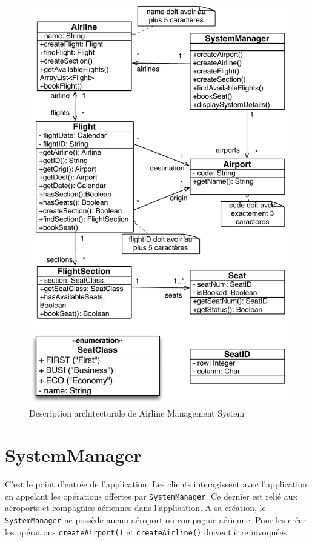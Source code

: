 \documentclass[a4paper,12pt,francais,twoside]{article}
\begin{document}
\begin{figure}[h!]
	\centering
\includegraphics[scale=0.8]{ams}
\caption{Description architecturale de Airline Management System}
\label{fig:ams}
\end{figure}

\section{SystemManager}

C'est le point d'entrée de l'application. Les clients interagissent
avec l'application en appelant les opérations offertes par \texttt{SystemManager}.
Ce dernier est relié aux aéroports et compagnies aériennes dans l'application.
A sa création, le \texttt{SystemManager} ne possède aucun aéroport ou compagnie aérienne.
Pour les créer les opérations \texttt{createAirport()} et \texttt{createAirline()}
doivent être invoquées. 
\end{document}
